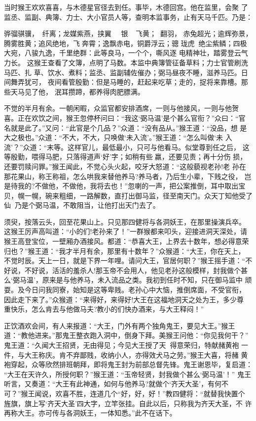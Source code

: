 当时猴王欢欢喜喜，与木德星官径去到任。事毕，木德回宫。他在监里，会聚
了监丞、监副、典簿、力士、大小官员人等，查明本监事务，止有天马千匹。乃是：

骅骝骐骥，纤离；龙媒紫燕，挟翼；银，飞黄；翻羽，
赤兔超光；逾辉弥景，腾雾胜黄；追风绝地，飞奔霄；逸飘赤电，铜爵浮云；骢
珑虎，绝尘紫鳞；四极大宛，八骏九逸，千里绝群：此等良马，一个个，嘶风逐
电精神壮，踏雾登云气力长。
这猴王查看了文簿，点明了马数。本监中典簿管征备草料；力士官管刷洗马匹、扎
草、饮水、煮料；监丞、监副辅佐催办；弼马昼夜不睡，滋养马匹。日间舞弄犹可，
夜间看管殷勤：但是马睡的，赶起来吃草；走的，捉将来靠槽。那些天马见了他，
泯耳攒蹄，都养得肉肥膘满。

不觉的半月有余。一朝闲暇，众监官都安排酒席，一则与他接风，一则与他贺
喜。正在欢饮之间，猴王忽停杯问曰：“我这‘弼马温’是个甚么官衔？”众曰：“官
名就是此了。”又问：“此官是个几品？”众道：“没有品从。”猴王道：“没品，想
是大之极也。”众道：“不大，不大，只唤做‘未入流’。”猴王道：“怎么叫做‘未
入流’？”众道：“末等。这样官儿，最低最小，只可与他看马。似堂尊到任之后，
这等殷勤，喂得马肥，只落得道声‘好’字；如稍有些羸，还要见责；再十分伤
损，还要罚赎问罪。”猴王闻此，不觉心头火起，咬牙大怒道：“这般藐视老孙!老
孙在那花果山，称王称祖，怎么哄我来替他养马?养马者，乃后生小辈，下贱之役，
岂是待我的?不做他，不做他，我将去也！”忽喇的一声，把公案推倒，耳中取出宝
贝，幌一幌，碗来粗细，一路解数，直打出御马监，径至南天门。众天丁知他受了
仙，乃是个弼马温，不敢阻当，让他打出天门去了。

须臾，按落云头，回至花果山上。只见那四健将与各洞妖王，在那里操演兵卒。
这猴王厉声高叫道：“小的们!老孙来了！”一群猴都来叩头，迎接进洞天深处，请
猴王高登宝位，一壁厢办酒接风。都道：“恭喜大王，上界去十数年，想必得意荣
归也？”猴王道：“我才半月有余，那里有十数年？”众猴道：“大王，你在天上，
不觉时辰。天上一日，就是下界一年哩。请问大王，官居何职？”猴王摇手道：“不
好说，不好说，活活的羞杀人!那玉帝不会用人，他见老孙这般模样，封我做个甚
么‘弼马温’，原来是与他养马，未入流品之类。我初到任时不知，只在御马监中
顽耍。及今日问我同寮，始知是这等卑贱。老孙心中大恼，推倒席面，不受官衔，
因此走下来了。”众猴道：“来得好，来得好!大王在这福地洞天之处为王，多少尊
重快乐，怎么肯去与他做马夫?教小的们快办酒来，与大王释闷！”

正饮酒欢会间，有人来报道：“大王，门外有两个独角鬼王，要见大王。”猴王
道：“教他进来。”那鬼王整衣跑入洞中，倒身下拜。美猴王问他：“你见我何干？”
鬼王道：“久闻大王招贤，无由得见；今见大王授了天，得意荣归，特献赭黄袍
一件，与大王称庆。肯不弃鄙贱，收纳小人，亦得效犬马之劳。”猴王大喜，将赭
黄袍穿起，众等欣然排班朝拜，即将鬼王封为前部总督先锋。鬼王谢恩毕，复启道：
“大王在天许久，所授何职？”猴王道：“玉帝轻贤，封我做个甚么‘弼马温’！”
鬼王听言，又奏道：“大王有此神通，如何与他养马?就做个‘齐天大圣’，有何不
可？”猴王闻说，欢喜不胜，连道几个“好，好，好！”教四健将：“就替我快置个
旌旗，旗上写‘齐天大圣’四大字，立竿张挂。自此以后，只称我为齐天大圣，不
许再称大王。亦可传与各洞妖王，一体知悉。”此不在话下。

